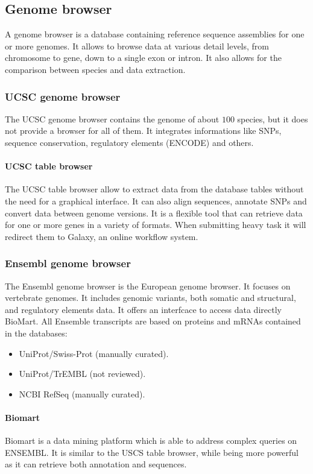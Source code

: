 	\subsection{Genome browser}
	A genome browser is a database containing reference sequence assemblies for one or more genomes.
	It allows to browse data at various detail levels, from chromosome to gene, down to a single exon or intron.
	It also allows for the comparison between species and data extraction.

		\subsubsection{UCSC genome browser}
		The UCSC genome browser contains the genome of about $100$ species, but it does not provide a browser for all of them.
		It integrates informations like SNPs, sequence conservation, regulatory elements (ENCODE) and others.

			\paragraph{UCSC table browser}
			The UCSC table browser allow to extract data from the database tables without the need for a graphical interface.
			It can also align sequences, annotate SNPs and convert data between genome versions.
			It is a flexible tool that can retrieve data for one or more genes in a variety of formats.
			When submitting heavy task it will redirect them to Galaxy, an online workflow system.

		\subsubsection{Ensembl genome browser}
		The Ensembl genome browser is the European genome browser.
		It focuses on vertebrate genomes.
		It includes genomic variants, both somatic and structural, and regulatory elements data.
		It offers an interfcace to access data directly BioMart.
		All Ensemble transcripts are based on proteins and mRNAs contained in the databases:

		\begin{multicols}{3}
			\begin{itemize}
				\item UniProt/Swiss-Prot (manually curated).
				\item UniProt/TrEMBL (not reviewed).
				\item NCBI RefSeq (manually curated).
			\end{itemize}
		\end{multicols}

			\paragraph{Biomart}
			Biomart is a data mining platform which is able to address complex queries on ENSEMBL.
			It is similar to the USCS table browser, while being more powerful as it can retrieve both annotation and sequences.
